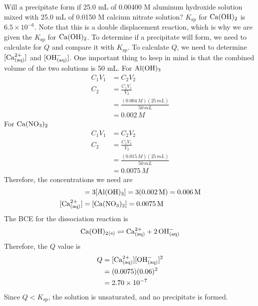 \begin{sample}{Will a precipitate form if 25.0 mL of 0.00400 M aluminum hydroxide solution 
    mixed with 25.0 mL of 0.0150 M calcium nitrate solution? $K_\mathrm{sp}$ for $\ch{Ca(OH)2}$
    is $6.5\times10^{-6}$.}
    Note that this is a double displacement reaction, which is why we are given the $K_\mathrm{sp}$
    for $\ch{Ca(OH)2}$. To determine if a precipitate will form, we need to calculate for $Q$ and
    compare it with $K_\mathrm{sp}$. To calculate $Q$, we need to determine $[\ch{Ca^{2+}_{(aq)}}]$
    and $[\ch{OH^-_{(aq)}}]$. One important thing to keep in mind is that the combined volume of
    the two solutions is 50 mL. For $\ch{Al(OH)3}$
    \begin{align*}
        C_1V_1&=C_2V_2\\
        C_2&=\frac{C_1V_1}{V_2}\\
           &=\frac{(0.004\,\si{M})(25\,\si{mL})}{50\,\si{mL}}\\
           &=0.002\,\si{M}
    \end{align*}
    For $\ch{Ca(NO3)2}$
    \begin{align*}
        C_1V_1&=C_2V_2\\
        C_2&=\frac{C_1V_1}{V_2}\\
           &=\frac{(0.015\,\si{M})(25\,\si{mL})}{50\,\si{mL}}\\
           &=0.0075\,\si{M}
    \end{align*}
    Therefore, the concentrations we need are
    \begin{align*}
        [\ch{OH^-_{(aq)}}]&=3[\ch{Al(OH)3}]=3(0.002\,\si{M})=0.006\,\si{M}\\
        [\ch{Ca^{2+}_{(aq)}}]&=[\ch{Ca(NO3)2}]=0.0075\,\si{M}
    \end{align*}
    The BCE for the dissociation reaction is
    \[
        \ch{Ca(OH)2_{(s)}}\rightleftharpoons \ch{Ca^{2+}_{(aq)}}+\ch{2OH^-_{(aq)}}
    \]
    Therefore, the $Q$ value is
    \begin{align*}
        Q&=[\ch{Ca^{2+}_{(aq)}}][\ch{OH^-_{(aq)}}]^2\\
         &=(0.0075)(0.06)^2\\
         &=2.70\times10^{-7}
    \end{align*}
    Since $Q<K_\mathrm{sp}$, the solution is unsaturated, and no precipitate is formed.
\end{sample}
